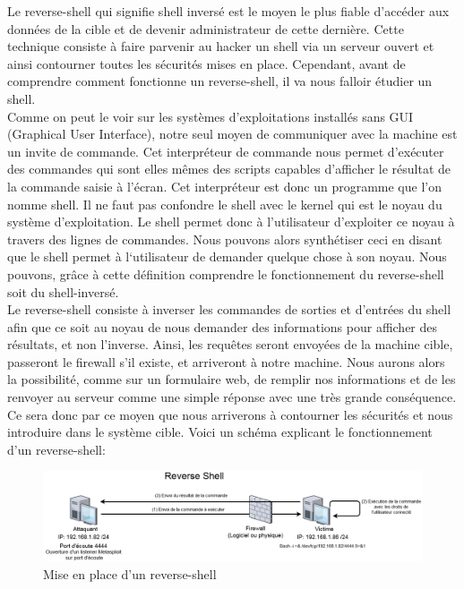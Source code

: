 Le reverse-shell qui signifie shell inversé est le moyen le plus fiable d’accéder aux données de la cible et de devenir administrateur de cette dernière. Cette technique consiste à faire parvenir au hacker un shell via un serveur ouvert et ainsi contourner toutes les sécurités mises en place. Cependant, avant de comprendre comment fonctionne un reverse-shell, il va nous falloir étudier un shell.\\
Comme on peut le voir sur les systèmes d’exploitations installés sans GUI (Graphical User Interface), notre seul moyen de communiquer avec la machine est un invite de commande. Cet interpréteur de commande nous permet d’exécuter des commandes qui sont elles mêmes des scripts capables d’afficher le résultat de la commande saisie à l’écran. Cet interpréteur est donc un programme que l’on nomme shell. Il ne faut pas confondre le shell avec le kernel qui est le noyau du système d’exploitation. Le shell permet donc à l’utilisateur d’exploiter ce noyau à travers des lignes de commandes.
Nous pouvons alors synthétiser ceci en disant que le shell permet à l‘utilisateur de demander quelque chose à son noyau.
Nous pouvons, grâce à cette définition comprendre le fonctionnement du reverse-shell soit du shell-inversé.\\
Le reverse-shell consiste à inverser les commandes de sorties et d'entrées du shell afin que ce soit au noyau de nous demander des informations pour afficher des résultats, et non l’inverse.
Ainsi, les requêtes seront envoyées de la machine cible, passeront le firewall s’il existe, et arriveront à notre machine. Nous aurons alors la possibilité, comme sur un formulaire web, de remplir nos informations et de les renvoyer au serveur comme une simple réponse avec une très grande conséquence.
Ce sera donc par ce moyen que nous arriverons à contourner les sécurités et nous introduire dans le système cible. Voici un schéma explicant le fonctionnement d'un reverse-shell:

\begin{figure}[htp!]
  \centering
  \setlength\figureheight{7cm}
  \setlength\figurewidth{9cm}
  \includegraphics[width=1\textwidth]{oui/images/Reverse_shell-meterpreter/reverse-shell.PNG}
  \caption{Mise en place d'un reverse-shell}
  \label{fig:courbe-tikz}
\end{figure}

